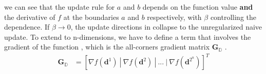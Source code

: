 we can see that the update rule for $a$ and $b$ depends on the function value \textbf{and} the derivative of $f$ at the boundaries $a$ and $b$ respectively, with $\beta$ controlling the dependence.
If $\beta \rightarrow 0 $, the update directions in \eqLabel{\ref{eq:update-oir-3}} collapse to the unregularized naive update. To extend to n-dimensions, we have to define a term that involves the gradient of the function , which is the all-corners gradient matrix  $\mathbf{G}_{\mathbb{D}}$ .
\begin{equation}
\begin{aligned} 
\mathbf{G}_{\mathbb{D}} &= \left[\nabla f(\mathbf{d}^{1})~|~\nabla f(\mathbf{d}^{2})~|~...~|~\nabla f(\mathbf{d}^{2^{n}}) \right]^{T} 
\label{eq:n-gradient}
\end{aligned}
\end{equation}
